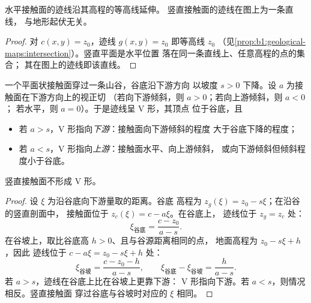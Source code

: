 \begin{proposition}[水平与竖直接触面]\label{prop:b1:geological-maps:hv}
水平接触面的迹线沿其高程的等高线延伸。
竖直接触面的迹线在图上为一条直线，
与地形起伏无关。
\end{proposition}

\begin{proof}
对 $c(x,y) = z_0$，迹线 $g(x,y) = z_0$ 即等高线 $z_0$
（见\cref{prop:b1:geological-maps:intersection}）。竖直平面是水平位置
落在同一条直线上、任意高程的点的集合；
其在图上的迹线即该直线。
\end{proof}

\begin{theorem}[V 字法则]\label{thm:b1:geological-maps:v-rule}
一个平面状接触面穿过一条山谷，谷底沿下游方向
以坡度 $s > 0$ 下降。设 $a$ 为接触面在下游方向上的视正切
（若向下游倾斜，则 $a > 0$；若向上游倾斜，则 $a < 0$；
若水平，则 $a = 0$）。于是迹线呈 V 形，其顶点
位于谷底，且
\begin{itemize}
  \item 若 $a > s$，V 形指向\emph{下游}：接触面向下游倾斜的程度
        大于谷底下降的程度；
  \item 若 $a < s$，V 形指向\emph{上游}：接触面水平、向上游倾斜，
        或向下游倾斜但倾斜程度小于谷底。
\end{itemize}
竖直接触面不形成 V 形。
\end{theorem}

\begin{proof}
设 $\xi$ 为沿谷底向下游量取的距离。谷底
高程为 $z_g(\xi) = z_0 - s\xi$；在沿谷的竖直剖面中，
接触面位于 $z_c(\xi) = c - a\xi$。在谷底上，
迹线位于 $z_g = z_c$ 处：
\[
  \xi_{\text{谷底}} = \frac{c - z_0}{a - s}.
\]
在谷坡上，取比谷底高 $h > 0$、且与谷源距离相同的点，
地面高程为 $z_0 - s\xi + h$，因此
迹线位于 $c - a\xi = z_0 - s\xi + h$ 处：
\[
  \xi_{\text{谷坡}} = \frac{c - z_0 - h}{a - s}, \qquad
  \xi_{\text{谷底}} - \xi_{\text{谷坡}} = \frac{h}{a - s}.
\]
若 $a > s$，迹线在谷底上比在谷坡上更靠下游：
V 形指向下游。若 $a < s$，则情况相反。竖直接触面
穿过谷底与谷坡时对应的 $\xi$ 相同。
\end{proof}

